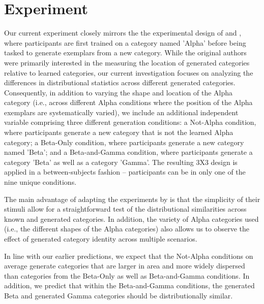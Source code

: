 \documentclass[10pt,letterpaper]{article}
\begin{document}
\section{Experiment}
Our current experiment closely mirrors the the experimental design of  and , where participants are first trained on a category named 'Alpha' before being tasked to generate exemplars from a new category. While the original authors were primarily interested in the measuring the location of generated categories relative to learned categories, our current investigation focuses on analyzing the differences in distributional statistics across different generated categories. Consequently, in addition to varying the shape and location of the Alpha category (i.e., across different Alpha conditions where the position of the Alpha exemplars are systematically varied), we include an additional independent variable comprising three different generation conditions: a Not-Alpha condition, where participants generate a new category that is not the learned Alpha category; a Beta-Only condition, where participants generate a new category named 'Beta'; and a Beta-and-Gamma condition, where participants generate a category 'Beta' as well as a category 'Gamma'. The resulting 3X3 design is applied in a between-subjects fashion -- participants can be in only one of the nine unique conditions. 

The main advantage of adapting the experiments by   is that the simplicity of their stimuli allow for a straightforward test of the distributional similarities across known and generated categories. In addition, the variety of Alpha categories used (i.e., the different shapes of the Alpha categories) also allows us to observe the effect of generated category identity across multiple scenarios. 

In line with our earlier predictions, we expect that the Not-Alpha conditions on average generate categories that are larger in area and more widely dispersed than categories from the Beta-Only as well as Beta-and-Gamma conditions. In addition, we predict that within the Beta-and-Gamma conditions, the generated Beta and generated Gamma categories should be distributionally similar. 
\end{document}
